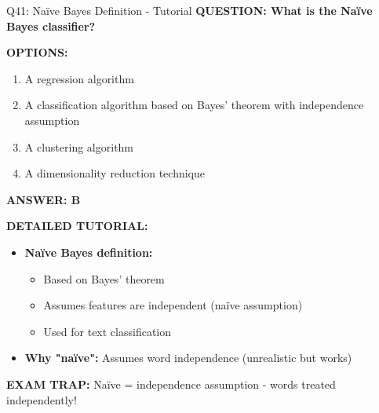\documentclass[8pt]{beamer}
\begin{document}
	\begin{frame}{Q41: Naïve Bayes Definition - Tutorial}
		\fontsize{6.5}{7.5}\selectfont
		\textbf{QUESTION: What is the Naïve Bayes classifier?}
		
		\vspace{0.1cm}
		\textbf{OPTIONS:}
		\begin{enumerate}
			\item A regression algorithm
			\item A classification algorithm based on Bayes' theorem with independence assumption
			\item A clustering algorithm
			\item A dimensionality reduction technique
		\end{enumerate}
		
		\vspace{0.1cm}
		\textcolor{myblue}{\textbf{ANSWER: B}}
		
		\vspace{0.1cm}
		\textbf{DETAILED TUTORIAL:}
		\begin{itemize}
			\item \textbf{Naïve Bayes definition:}
			\begin{itemize}
				\item Based on Bayes' theorem
				\item Assumes features are independent (naïve assumption)
				\item Used for text classification
			\end{itemize}
			\item \textbf{Why "naïve":} Assumes word independence (unrealistic but works)
		\end{itemize}
		
		\textcolor{myred}{\textbf{EXAM TRAP:}} Naïve = \textcolor{myblue}{independence assumption} - words treated independently!
	\end{frame}
	
\end{document}
